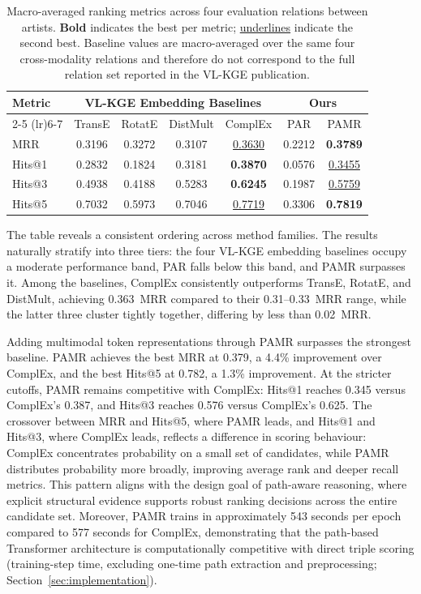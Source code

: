 \documentclass[runningheads]{llncs}
\begin{document}
\begin{table}[t]
  \centering
  \setlength{\tabcolsep}{2pt}
  \renewcommand{\arraystretch}{1.15}
  {\footnotesize
    \begin{tabular}{l|cccc|cc}
      \toprule
      \multirow{2}{*}{Metric} &
      \multicolumn{4}{|c|}{VL-KGE Embedding Baselines} &
      \multicolumn{2}{|c|}{Ours} \\
      \cmidrule(lr){2-5} \cmidrule(lr){6-7}
      & TransE & RotatE & DistMult & ComplEx & PAR & PAMR \\
      \midrule
      MRR  & 0.3196 & 0.3272 & 0.3107 & \underline{0.3630} & 0.2212 & \textbf{0.3789} \\
      Hits@1 & 0.2832 & 0.1824 & 0.3181 & \textbf{0.3870} & 0.0576 & \underline{0.3455} \\
      Hits@3 & 0.4938 & 0.4188 & 0.5283 & \textbf{0.6245} & 0.1987 & \underline{0.5759} \\
      Hits@5 & 0.7032 & 0.5973 & 0.7046 & \underline{0.7719} & 0.3306 & \textbf{0.7819} \\
      \bottomrule
  \end{tabular}}
  \caption{Macro-averaged ranking metrics across four evaluation
    relations between artists. \textbf{Bold} indicates the best per metric;
    \underline{underlines} indicate the second best. Baseline values are
    macro-averaged over the same four cross-modality relations and therefore
    do not correspond to the full relation set reported in the VL-KGE
  publication.}
  \label{tab:results}
\end{table}

The table reveals a consistent ordering across method
families. The results naturally stratify into three tiers: the four
VL-KGE embedding baselines occupy a moderate performance band, PAR
falls below this band, and PAMR surpasses it. Among the baselines,
ComplEx consistently outperforms TransE, RotatE, and DistMult,
achieving 0.363~MRR compared to their 0.31--0.33~MRR range, while the
latter three cluster tightly together, differing by less than
0.02~MRR.

Adding multimodal token representations through PAMR surpasses the
strongest baseline. PAMR achieves the best MRR at 0.379, a 4.4\%
improvement over ComplEx, and the best Hits@5 at 0.782, a 1.3\%
improvement. At the stricter cutoffs, PAMR remains competitive with
ComplEx: Hits@1 reaches 0.345 versus ComplEx's 0.387, and Hits@3
reaches 0.576 versus ComplEx's 0.625. The crossover between MRR and
Hits@5, where PAMR leads, and Hits@1 and Hits@3, where ComplEx leads,
reflects a difference in scoring behaviour: ComplEx concentrates
probability on a small set of candidates, while PAMR distributes
probability more broadly, improving average rank and deeper recall
metrics. This pattern aligns with the design goal of path-aware
reasoning, where explicit structural evidence supports robust ranking
decisions across the entire candidate set. Moreover, PAMR trains in
approximately 543 seconds per epoch compared to 577 seconds for
ComplEx, demonstrating that the path-based Transformer architecture is
computationally competitive with direct triple scoring (training-step
  time, excluding one-time path extraction and preprocessing;
Section~\ref{sec:implementation}).
\end{document}
